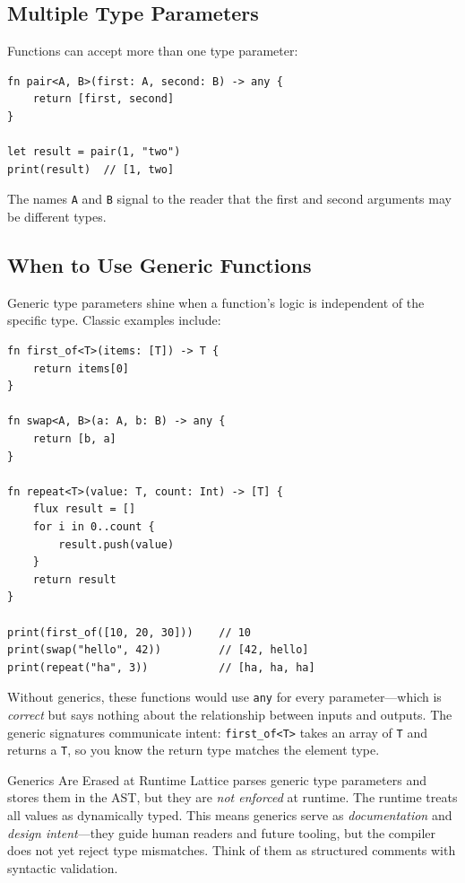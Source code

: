 \subsection{Multiple Type Parameters}

Functions can accept more than one type parameter:

\begin{lstlisting}[language=Lattice, caption={Multiple type parameters}]
fn pair<A, B>(first: A, second: B) -> any {
    return [first, second]
}

let result = pair(1, "two")
print(result)  // [1, two]
\end{lstlisting}

The names \lstinline|A| and \lstinline|B| signal to the reader that the
first and second arguments may be different types.

\subsection{When to Use Generic Functions}

Generic type parameters shine when a function's logic is independent of the
specific type. Classic examples include:

\begin{lstlisting}[language=Lattice, caption={Generic utility functions}]
fn first_of<T>(items: [T]) -> T {
    return items[0]
}

fn swap<A, B>(a: A, b: B) -> any {
    return [b, a]
}

fn repeat<T>(value: T, count: Int) -> [T] {
    flux result = []
    for i in 0..count {
        result.push(value)
    }
    return result
}

print(first_of([10, 20, 30]))    // 10
print(swap("hello", 42))         // [42, hello]
print(repeat("ha", 3))           // [ha, ha, ha]
\end{lstlisting}

Without generics, these functions would use \lstinline|any| for every
parameter---which is \emph{correct} but says nothing about the relationship
between inputs and outputs. The generic signatures communicate intent:
\lstinline|first_of<T>| takes an array of \lstinline|T| and returns a
\lstinline|T|, so you know the return type matches the element type.

\begin{notebox}{Generics Are Erased at Runtime}
Lattice parses generic type parameters and stores them in the AST, but
they are \emph{not enforced} at runtime. The runtime treats all values
as dynamically typed. This means generics serve as \emph{documentation}
and \emph{design intent}---they guide human readers and future tooling,
but the compiler does not yet reject type mismatches. Think of them as
structured comments with syntactic validation.
\end{notebox}

